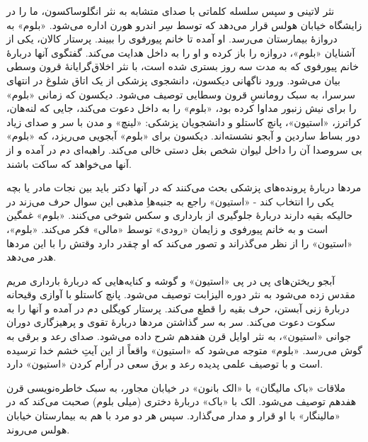 \documentclass[12pt]{book}
\newcommand{\noun}[1]{«{#1}»}
\begin{document}
    نثر لاتینی و سپس سلسله کلماتی با صدای متشابه به نثر انگلوساکسون، ما را در زایشگاه خیابان هولس قرار می‌دهد که توسط سِر اندرو هورن اداره می‌شود. \noun{بلوم} به دروازۀ بیمارستان می‌رسد. او آمده تا خانم پیورفوی را ببیند. پرستار کالان، یکی از آشنایان \noun{بلوم}، دروازه را باز کرده و او را به داخل هدایت می‌کند. گفتگوی آنها دربارۀ خانم پیورفوی که به مدت سه روز بستری شده است، با نثر اخلاق‌گرایانۀ قرون وسطی بیان می‌شود. ورود ناگهانی دیکسون، دانشجوی پزشکی از یک اتاق شلوغ در انتهای سرسرا، به سبک رومانسِ قرون وسطایی توصیف می‌شود. دیکسون که زمانی \noun{بلوم} را برای نیش زنبور مداوا کرده بود، \noun{بلوم} را به داخل دعوت می‌کند، جایی که لنه‌هان، کراترز، \noun{استیون}، پانچ کاستلو و دانشجویان پزشکی: \noun{لینچ} و مدن با سر و صدای زیاد دور بساط ساردین و آبجو نشسته‌اند. دیکسون برای \noun{بلوم} آبجویی می‌ریزد، که \noun{بلوم} بی سروصدا آن را داخل لیوان شخص بغل دستی خالی می‌کند. راهبه‌ای دم در آمده و از آنها می‌خواهد که ساکت باشند.

    مردها دربارۀ پرونده‌های پزشکی بحث می‌کنند که در آنها دکتر باید بین نجات مادر یا بچه یکی را انتخاب کند - \noun{استیون} راجع به جنبه‌هاِ مذهبی این سوال حرف می‌زند در حالیکه بقیه دارند دربارۀ جلوگیری از بارداری و سکس شوخی می‌کنند. \noun{بلوم} غمگین است و به خانم پیورفوی و زایمان \noun{رودی} توسط \noun{مالی} فکر می‌کند. \noun{بلوم}، \noun{استیون} را از نظر می‌گذراند و تصور می‌کند که او چقدر دارد وقتش را با این مردها هدر می‌دهد.

    آبجو ریختن‌های پی در پی \noun{استیون} و گوشه و کنایه‌هایی که دربارۀ بارداری مریم مقدس زده می‌شود به نثر دوره الیزابت توصیف می‌شود. پانچ کاستلو با آوازی وقیحانه دربارۀ زنی آبستن، حرف بقیه را قطع می‌کند. پرستار کویگلی دم در آمده و آنها را به سکوت دعوت می‌کند. سر به سر گذاشتن مردها دربارۀ تقوی و پرهیزگاری دوران جوانی \noun{استیون}، به نثر اوایل قرن هفدهم شرح داده می‌شود. صدای رعد و برقی به گوش می‌رسد. \noun{بلوم} متوجه می‌شود که \noun{استیون} واقعاً از این آیتِ خشم خدا ترسیده است و با توصیف علمی پدیده رعد و برق سعی در آرام کردن \noun{استیون} دارد.

    ملاقات \noun{باک مالیگان‬} با \noun{الک بانون} در خیابان مجاور، به سبک خاطره‌نویسی قرن هفدهم توصیف می‌شود. الک با \noun{باک}  دربارۀ دختری (میلی بلوم) صحبت می‌کند که در \noun{مالینگار} با او قرار و مدار می‌گذارد. سپس هر دو مرد با هم به بیمارستان خیابان هولس می‌روند.
\end{document}
